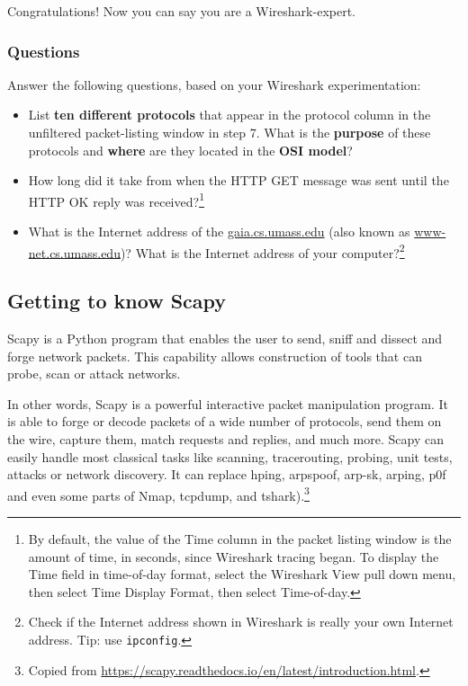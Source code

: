 \documentclass[11pt,a4paper]{article}
\begin{document}
Congratulations! Now you can say you are a Wireshark-expert.

\subsubsection{Questions}

Answer the following questions, based on your Wireshark experimentation:
\begin{itemize}
	\item List \textbf{ten different protocols} that appear in the protocol column in the unfiltered
	packet-listing window in step 7. What is the \textbf{purpose} of these protocols and \textbf{where} are they located in the \textbf{OSI model}?

	\item How long did it take from when the HTTP GET message was sent until the HTTP
	OK reply was received?\footnote{By default, the value of the Time column in the packet listing
		window is the amount of time, in seconds, since Wireshark tracing began.
		To display the Time field in time-of-day format, select the Wireshark View pull
		down menu, then select Time Display Format, then select Time-of-day.}

	\item What is the Internet address of the \url{gaia.cs.umass.edu} (also known as \url{www-net.cs.umass.edu})? What is the Internet address of your computer?\footnote{Check if the Internet address shown in Wireshark is really your own Internet address. Tip: use \texttt{ipconfig}.}
\end{itemize}

\subsection{Getting to know Scapy}
Scapy is a Python program that enables the user to send, sniff and dissect and forge network packets. This capability allows construction of tools that can probe, scan or attack networks.

In other words, Scapy is a powerful interactive packet manipulation program. It is able to forge or decode packets of a wide number of protocols, send them on the wire, capture them, match requests and replies, and much more. Scapy can easily handle most classical tasks like scanning, tracerouting, probing, unit tests, attacks or network discovery. It can replace hping, arpspoof, arp-sk, arping, p0f and even some parts of Nmap, tcpdump, and tshark).\footnote{Copied from \url{https://scapy.readthedocs.io/en/latest/introduction.html}.}
\end{document}
